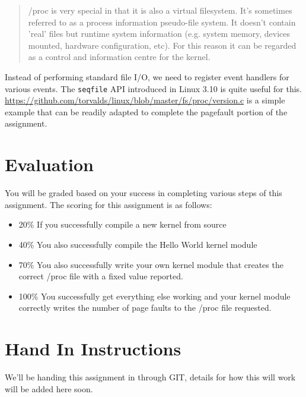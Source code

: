 \documentclass[11pt]{article}
\begin{document}
\begin{enumerate}
\begin{quote}
/proc is very special in that it is also a virtual filesystem. It's sometimes referred to as a process information pseudo-file system. It doesn't contain 'real' files but runtime system information (e.g. system memory, devices mounted, hardware configuration, etc). For this reason it can be regarded as a control and information centre for the kernel.
\end{quote}

Instead of performing standard file I/O, we need to register event handlers for various events. The \texttt{seqfile} API introduced in Linux 3.10 is quite useful for this. \url{https://github.com/torvalds/linux/blob/master/fs/proc/version.c} is a simple example that can be readily adapted to complete the pagefault portion of the assignment.
\end{enumerate}

\section*{Evaluation}

You will be graded based on your success in completing various steps of this assignment. The scoring for this assignment is as follows:

\begin{itemize}
\item 20\% If you successfully compile a new kernel from source
\item 40\% You also successfully compile the Hello World kernel module
\item 70\% You also successfully write your own kernel module that creates the correct /proc file with a fixed value reported.
\item 100\% You successfully get everything else working and your kernel module correctly writes the number of page faults to the /proc file requested. 
\end{itemize}


\section*{Hand In Instructions}

We'll be handing this assignment in through GIT, details for how this will work will be added here soon. 
\end{document}
